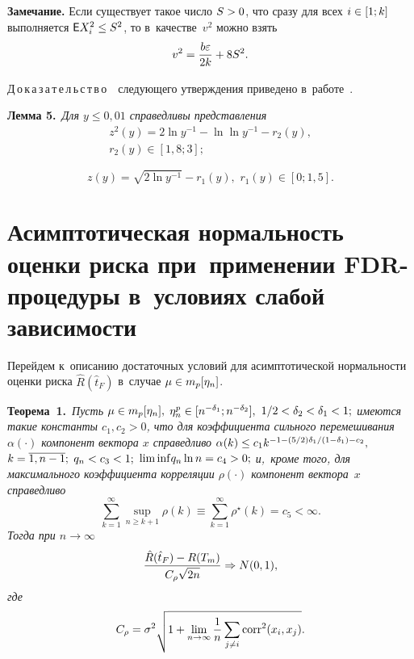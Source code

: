 \begin{multicols}{2}
\noindent
\textbf{Замечание.}
Если существует такое число $S \hm> 0$, что сразу для всех $i\hm\in[1;k]$  выполняется 
${\mathsf E} X_i^2 \hm\leq S^2$, то в~качестве~$v^2$ можно взять
$$
v^2 = \displaystyle\frac{\displaystyle b \varepsilon\mathstrut}{\displaystyle 2k\mathstrut} + 8 S^2.
$$


Д\,о\,к\,а\,з\,а\,т\,е\,л\,ь\,с\,т\,в\,о\ \ сле\-ду\-юще\-го утверж\-де\-ния приведено в~работе~\cite{AdaptingFDR}.

\smallskip

\noindent
\textbf{Лемма 5.}\ 
\textit{Для $y\leq 0{,}01$ справедливы представления}
\begin{multline}
\label{lem1eq1}
z^2(y) = 2 \ln y^{-1} - \ln \ln y^{-1} - r_2(y), \\
 r_2(y) \in [1{,}8; 3];
\end{multline}

\noindent
\begin{equation}
\label{lem1eq2}
z(y) = \sqrt{2 \ln y^{-1}} - r_1(y), \, \, r_1(y) \in [0; 1{,}5].
\end{equation}


\section{Асимптотическая нормальность оценки риска при~применении FDR-процедуры в~условиях слабой зависимости}

Перейдем к~описанию достаточных условий для асимптотической нормальности оценки 
риска $\hat{R}(\hat{t}_F)$ в~случае $\mu \hm\in m_p[\eta_n]$.

\smallskip

\noindent
\textbf{Теорема~1.}\
\textit{Пусть $\mu \hm\in m_p[\eta_n],$ $\eta_n^p \hm\in[n^{-\delta_1}; n^{-\delta_2}],$ $1/2 \hm< 
\delta_2 \hm< \delta_1<1;$ имеются такие константы $c_1, c_2>0$, что для 
коэффициента сильного перемешивания $\alpha(\cdot)$ компонент вектора $x$ 
справедливо  $\alpha(k) \hm\leq c_1 k^{-1-(5/2)\delta_1/(1-\delta_1)-c_2},$ 
$k\hm=\overline{1,n-1};$ $q_n \hm< c_3 \hm< 1;$ $\mathrm{lim\,inf} q_n \ln n \hm= c_4 \hm> 0;$ и,~кроме того, 
для максимального коэффициента корреляции $\rho(\cdot)$ компонент вектора~$x$ 
справедливо}
$$
\sum\limits_{k = 1}^{\infty} \sup\limits_{n\geq k+1} \rho(k) \equiv 
\sum\limits_{k = 1}^{\infty}  \rho^\star (k) = c_5 < \infty. 
$$
\textit{Тогда при $n \to \infty$}
$$
\displaystyle\frac{\displaystyle \hat{R}(\hat{t}_F) - R(T_m)\mathstrut}{\displaystyle C_\rho \sqrt{2n}\mathstrut} \Rightarrow N(0, 1),
$$
\textit{где}
$$
C_\rho = \sigma^2\sqrt{1 +  \lim\limits_{n\to\infty} \displaystyle\frac{\displaystyle 1\mathstrut}{\displaystyle n\mathstrut} \sum\limits_{j\neq i} \mathrm{corr}^2 (x_i, x_j)}.
$$


\end{multicols}
